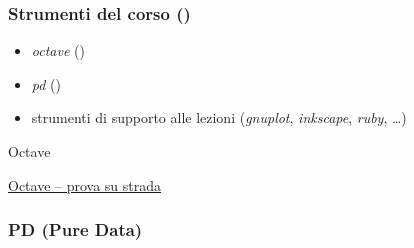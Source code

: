%
%
%
%
%
\setcounter{ms}{1}

\begin{frame}
    \frametitle{Strumenti del corso ()}

	\begin{itemize}[<+- | alert@+->]

		\item \emph{octave} ()

		\item \emph{pd} ()

		\item strumenti di supporto alle lezioni (\emph{gnuplot},
        \emph{inkscape}, \emph{ruby}, \ldots)

	\end{itemize}

\end{frame}

\begin{frame}{Octave}

	\vspace*{0.45\textheight}
	\begin{center}
		\href{run:\exampledir/run\_octave}{Octave -- prova su strada}
	\end{center}
	
\end{frame}

\begin{frame}
    \frametitle{PD (Pure Data)}

	\vspace*{0.45\textheight}
	\begin{center}
	\end{center}
	
\end{frame}
